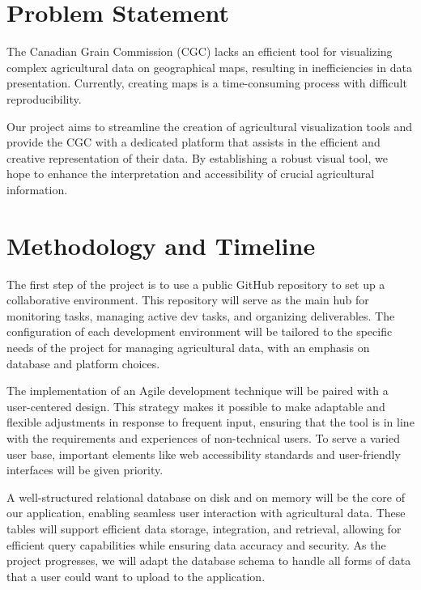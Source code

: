 \documentclass[12pt]{article}
\begin{document}
\newpage
\section*{Problem Statement}
The Canadian Grain Commission (CGC) lacks an efficient tool for visualizing complex agricultural data on geographical maps, resulting in inefficiencies in data presentation. Currently, creating maps is a time-consuming process with difficult reproducibility. 

Our project aims to streamline the creation of agricultural visualization tools and provide the CGC with a dedicated platform that assists in the efficient and creative representation of their data. By establishing a robust visual tool, we hope to enhance the interpretation and accessibility of crucial agricultural information. 

\section*{Methodology and Timeline}
The first step of the project is to use a public GitHub repository to set up a collaborative environment. This repository will serve as the main hub for monitoring tasks, managing active dev tasks, and organizing deliverables. The configuration of each development environment will be tailored to the specific needs of the project for managing agricultural data, with an emphasis on database and platform choices.  

The implementation of an Agile development technique will be paired with a user-centered design. This strategy makes it possible to make adaptable and flexible adjustments in response to frequent input, ensuring that the tool is in line with the requirements and experiences of non-technical users. To serve a varied user base, important elements like web accessibility standards and user-friendly interfaces will be given priority. 

A well-structured relational database on disk and on memory will be the core of our application, enabling seamless user interaction with agricultural data. These tables will support efficient data storage, integration, and retrieval, allowing for efficient query capabilities while ensuring data accuracy and security. As the project progresses, we will adapt the database schema to handle all forms of data that a user could want to upload to the application. 
\end{document}
